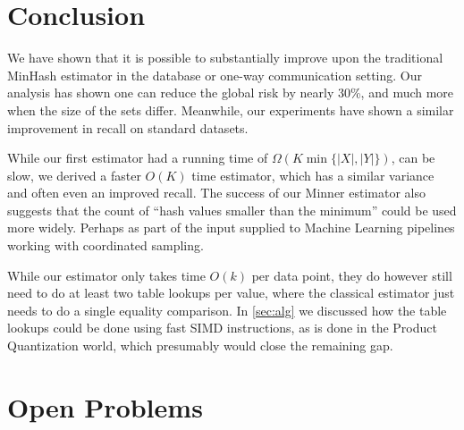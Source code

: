 

\section{Conclusion}

We have shown that it is possible to substantially improve upon the traditional MinHash estimator in the database or one-way communication setting.
Our analysis has shown one can reduce the global risk by nearly 30\%,
and much more when the size of the sets differ.
Meanwhile, our experiments have shown a similar improvement in recall on standard datasets.

While our first estimator had a running time of $\Omega(K \min\{|X|,|Y|\})$, can be slow, we derived a faster $O(K)$ time estimator, which has a similar variance and often even an improved recall.
The success of our Minner estimator also suggests that the count of ``hash values smaller than the minimum'' could be used more widely.
Perhaps as part of the input supplied to Machine Learning pipelines working with coordinated sampling.

While our estimator only takes time $O(k)$ per data point, they do however still need to do at least two table lookups per value, where the classical estimator just needs to do a single equality comparison.
In \cref{sec:alg} we discussed how the table lookups could be done using fast SIMD instructions, as is done in the Product Quantization world, which presumably would close the remaining gap.

\section{Open Problems}

